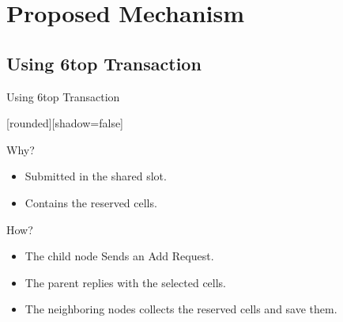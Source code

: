 \section{Proposed Mechanism}

\subsection{Using 6top Transaction}
\addtocounter{framenumber}{-1}
\begin{withoutheadline}
\begin{frame}{Using 6top Transaction}


[rounded][shadow=false]

\begin{block}{Why?}
    \begin{itemize}
    \item  Submitted in the shared slot.
    \item Contains the reserved cells.
    \end{itemize}
    \end{block}


\begin{block}{How?}
    \begin{itemize}
    \item The child node Sends an Add Request.
    \item<2-> The parent replies with the selected cells.
    \item<3-> The neighboring nodes collects the reserved cells and save them. 
    \end{itemize}
    \end{block}
    
    
\begin{figure}[p]


\end{figure}
\end{frame}
\end{withoutheadline}
